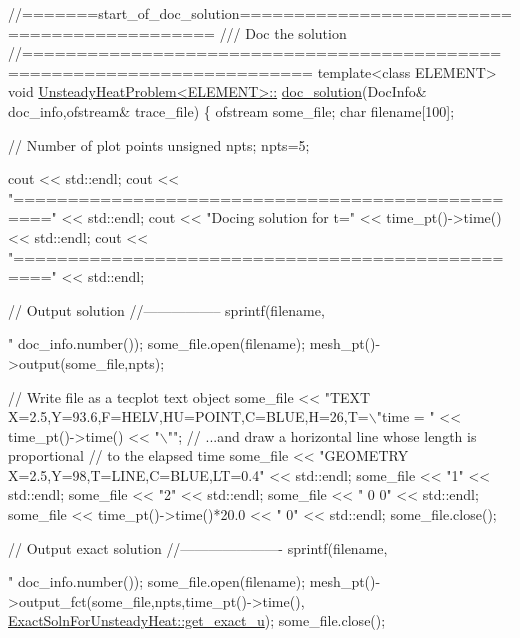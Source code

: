 \begin{DoxyCodeInclude}
\textcolor{comment}{//=======start\_of\_doc\_solution============================================}
\textcolor{comment}{/// Doc the solution}
\textcolor{comment}{}\textcolor{comment}{//========================================================================}
\textcolor{keyword}{template}<\textcolor{keyword}{class} ELEMENT>
\textcolor{keywordtype}{void} \hyperlink{classUnsteadyHeatProblem_a2c0c4b762d2dbde7396dca2a6750f433}{UnsteadyHeatProblem<ELEMENT>::}
\hyperlink{classUnsteadyHeatProblem_a2c0c4b762d2dbde7396dca2a6750f433}{doc\_solution}(DocInfo& doc\_info,ofstream& trace\_file)
\{ 
 ofstream some\_file;
 \textcolor{keywordtype}{char} filename[100];

 \textcolor{comment}{// Number of plot points}
 \textcolor{keywordtype}{unsigned} npts;
 npts=5;


 cout << std::endl;
 cout << \textcolor{stringliteral}{"================================================="} << std::endl;
 cout << \textcolor{stringliteral}{"Docing solution for t="} << time\_pt()->time() << std::endl;
 cout << \textcolor{stringliteral}{"================================================="} << std::endl;


 \textcolor{comment}{// Output solution }
 \textcolor{comment}{//-----------------}
 sprintf(filename,\textcolor{stringliteral}{"%
         doc\_info.number());
 some\_file.open(filename);
 mesh\_pt()->output(some\_file,npts);

 \textcolor{comment}{// Write file as a tecplot text object}
 some\_file << \textcolor{stringliteral}{"TEXT X=2.5,Y=93.6,F=HELV,HU=POINT,C=BLUE,H=26,T=\(\backslash\)"time = "} 
           << time\_pt()->time() << \textcolor{stringliteral}{"\(\backslash\)""};
 \textcolor{comment}{// ...and draw a horizontal line whose length is proportional}
 \textcolor{comment}{// to the elapsed time}
 some\_file << \textcolor{stringliteral}{"GEOMETRY X=2.5,Y=98,T=LINE,C=BLUE,LT=0.4"} << std::endl;
 some\_file << \textcolor{stringliteral}{"1"} << std::endl;
 some\_file << \textcolor{stringliteral}{"2"} << std::endl;
 some\_file << \textcolor{stringliteral}{" 0 0"} << std::endl;
 some\_file << time\_pt()->time()*20.0 << \textcolor{stringliteral}{" 0"} << std::endl;
 some\_file.close();


 \textcolor{comment}{// Output exact solution }
 \textcolor{comment}{//----------------------}
 sprintf(filename,\textcolor{stringliteral}{"%
         doc\_info.number());
 some\_file.open(filename);
 mesh\_pt()->output\_fct(some\_file,npts,time\_pt()->time(),
                       \hyperlink{namespaceExactSolnForUnsteadyHeat_a1d5b22857bd2a7825397daf1cf9c89eb}{ExactSolnForUnsteadyHeat::get\_exact\_u}); 
 some\_file.close();

}}
\end{DoxyCodeInclude}
